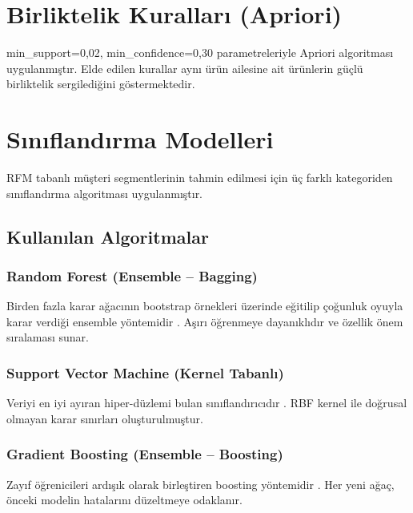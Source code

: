 \documentclass[conference]{IEEEtran}
\begin{document}
\section{Birliktelik Kuralları (Apriori)}

min\_support=0,02, min\_confidence=0,30 parametreleriyle Apriori algoritması uygulanmıştır. Elde edilen kurallar aynı ürün ailesine ait ürünlerin güçlü birliktelik sergilediğini göstermektedir.

\section{Sınıflandırma Modelleri}

RFM tabanlı müşteri segmentlerinin tahmin edilmesi için üç farklı kategoriden sınıflandırma algoritması uygulanmıştır.

\subsection{Kullanılan Algoritmalar}

\subsubsection{Random Forest (Ensemble -- Bagging)}
Birden fazla karar ağacının bootstrap örnekleri üzerinde eğitilip çoğunluk oyuyla karar verdiği ensemble yöntemidir \cite{breiman2001}. Aşırı öğrenmeye dayanıklıdır ve özellik önem sıralaması sunar.

\subsubsection{Support Vector Machine (Kernel Tabanlı)}
Veriyi en iyi ayıran hiper-düzlemi bulan sınıflandırıcıdır \cite{cortes1995}. RBF kernel ile doğrusal olmayan karar sınırları oluşturulmuştur.

\subsubsection{Gradient Boosting (Ensemble -- Boosting)}
Zayıf öğrenicileri ardışık olarak birleştiren boosting yöntemidir \cite{friedman2001}. Her yeni ağaç, önceki modelin hatalarını düzeltmeye odaklanır.
\end{document}
